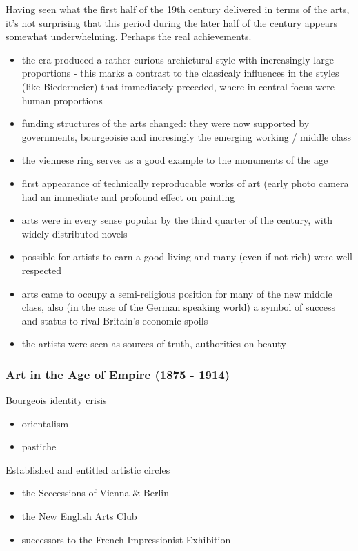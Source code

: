\documentclass[11pt]{article}
\begin{document}
Having seen what the first half of the 19th century delivered in terms
of the arts, it's not surprising that this period during the later half of
the century appears somewhat underwhelming. Perhaps the real
achievements.
\begin{itemize}
\item the era produced a rather curious archictural style with
increasingly large proportions - this marks a contrast to the
classicaly influences in the styles (like Biedermeier) that
immediately preceded, where in central focus were human proportions
\item funding structures of the arts changed: they were now supported by
governments, bourgeoisie and incresingly the emerging working /
middle class
\item the viennese ring serves as a good example to the monuments of the age
\item first appearance of technically reproducable works of art (early
photo camera had an immediate and profound effect on painting
\item arts were in every sense popular by the third quarter of the
century, with widely distributed novels
\item possible for artists to earn a good living and many (even if not
rich) were well respected
\item arts came to occupy a semi-religious position for many of the new
middle class, also (in the case of the German speaking world) a
symbol of success and status to rival Britain's economic spoils
\item the artists were seen as sources of truth, authorities on beauty
\end{itemize}



\subsubsection{Art in the Age of Empire (1875 - 1914)}
\label{sec:orgfac4225}
Bourgeois identity crisis
\begin{itemize}
\item orientalism
\item pastiche
\end{itemize}

Established and entitled artistic circles 
\begin{itemize}
\item the Seccessions of Vienna \& Berlin
\item the New English Arts Club
\item successors to the French Impressionist Exhibition
\end{itemize}
\end{document}
